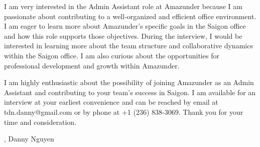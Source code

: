 \documentclass[letterpaper,11pt]{article}
\begin{document}
I am very interested in the Admin Assistant role at Amazunder because I am passionate about contributing to a well-organized and efficient office environment. I am eager to learn more about Amazunder's specific goals in the Saigon office and how this role supports those objectives. During the interview, I would be interested in learning more about the team structure and collaborative dynamics within the Saigon office. I am also curious about the opportunities for professional development and growth within Amazunder.
\vspace{10pt}

I am highly enthusiastic about the possibility of joining Amazunder as an Admin Assistant and contributing to your team's success in Saigon. I am available for an interview at your earliest convenience and can be reached by email at tdn.danny@gmail.com or by phone at +1 (236) 838-3069. Thank you for your time and consideration.
\vspace{20pt}

\Sincerely,
\vspace{40pt} %
Danny Nguyen

\end{document}
